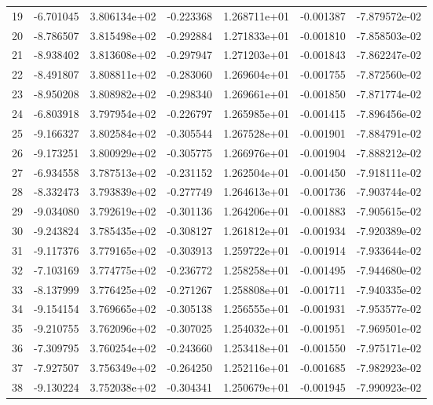 \begin{tabular}{rrrrrrr}
  19 &  -6.701045 &  3.806134e+02 & -0.223368 &  1.268711e+01 &  -0.001387 & -7.879572e-02 \\
  20 &  -8.786507 &  3.815498e+02 & -0.292884 &  1.271833e+01 &  -0.001810 & -7.858503e-02 \\
  21 &  -8.938402 &  3.813608e+02 & -0.297947 &  1.271203e+01 &  -0.001843 & -7.862247e-02 \\
  22 &  -8.491807 &  3.808811e+02 & -0.283060 &  1.269604e+01 &  -0.001755 & -7.872560e-02 \\
  23 &  -8.950208 &  3.808982e+02 & -0.298340 &  1.269661e+01 &  -0.001850 & -7.871774e-02 \\
  24 &  -6.803918 &  3.797954e+02 & -0.226797 &  1.265985e+01 &  -0.001415 & -7.896456e-02 \\
  25 &  -9.166327 &  3.802584e+02 & -0.305544 &  1.267528e+01 &  -0.001901 & -7.884791e-02 \\
  26 &  -9.173251 &  3.800929e+02 & -0.305775 &  1.266976e+01 &  -0.001904 & -7.888212e-02 \\
  27 &  -6.934558 &  3.787513e+02 & -0.231152 &  1.262504e+01 &  -0.001450 & -7.918111e-02 \\
  28 &  -8.332473 &  3.793839e+02 & -0.277749 &  1.264613e+01 &  -0.001736 & -7.903744e-02 \\
  29 &  -9.034080 &  3.792619e+02 & -0.301136 &  1.264206e+01 &  -0.001883 & -7.905615e-02 \\
  30 &  -9.243824 &  3.785435e+02 & -0.308127 &  1.261812e+01 &  -0.001934 & -7.920389e-02 \\
  31 &  -9.117376 &  3.779165e+02 & -0.303913 &  1.259722e+01 &  -0.001914 & -7.933644e-02 \\
  32 &  -7.103169 &  3.774775e+02 & -0.236772 &  1.258258e+01 &  -0.001495 & -7.944680e-02 \\
  33 &  -8.137999 &  3.776425e+02 & -0.271267 &  1.258808e+01 &  -0.001711 & -7.940335e-02 \\
  34 &  -9.154154 &  3.769665e+02 & -0.305138 &  1.256555e+01 &  -0.001931 & -7.953577e-02 \\
  35 &  -9.210755 &  3.762096e+02 & -0.307025 &  1.254032e+01 &  -0.001951 & -7.969501e-02 \\
  36 &  -7.309795 &  3.760254e+02 & -0.243660 &  1.253418e+01 &  -0.001550 & -7.975171e-02 \\
  37 &  -7.927507 &  3.756349e+02 & -0.264250 &  1.252116e+01 &  -0.001685 & -7.982923e-02 \\
  38 &  -9.130224 &  3.752038e+02 & -0.304341 &  1.250679e+01 &  -0.001945 & -7.990923e-02 \\

\end{tabular}
